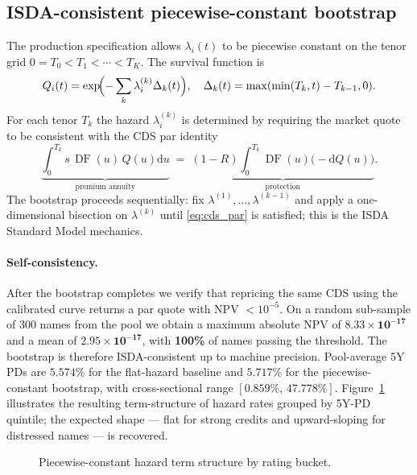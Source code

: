 \documentclass[11pt,a4paper]{article}
\newcommand{\1}{\mathbf{1}}
\newcommand{\dd}{\mathrm{d}}
\DeclareMathOperator{\DF}{DF}
\begin{document}
\subsection{ISDA-consistent piecewise-constant bootstrap}
The production specification allows \(\lambda_{i}(t)\) to be
piecewise constant on the tenor grid
\(0=T_{0}<T_{1}<\cdots<T_{K}\). The survival function is
\begin{equation}
Q_{i}(t)=\exp\!\Bigl(-\sum_{k}\lambda_{i}^{(k)}\Delta_{k}(t)\Bigr),
\quad \Delta_{k}(t)=\max(\min(T_{k},t)-T_{k-1},0).
\label{eq:survival_pwc}
\end{equation}
For each tenor \(T_{k}\) the hazard \(\lambda_{i}^{(k)}\) is determined
by requiring the market quote to be consistent with the CDS par identity
\begin{equation}
\underbrace{\int_{0}^{T_{k}}s\,\DF(u)\,Q(u)\dd u}_{\text{premium annuity}}
\;=\;
\underbrace{(1-R)\int_{0}^{T_{k}}\DF(u)\bigl(-\dd Q(u)\bigr)}_{\text{protection}} .
\label{eq:cds_par}
\end{equation}
The bootstrap proceeds sequentially: fix
\(\lambda^{(1)},\dots,\lambda^{(k-1)}\) and apply a one-dimensional
bisection on \(\lambda^{(k)}\) until \eqref{eq:cds_par} is satisfied;
this is the ISDA Standard Model mechanics.

\paragraph{Self-consistency.}
After the bootstrap completes we verify that repricing the same CDS
using the calibrated curve returns a par quote with NPV
\(<10^{-5}\).  On a random sub-sample of 300 names from the pool we
obtain a maximum absolute NPV of \(\mathbf{8.33\!\times\!10^{-17}}\)
and a mean of \(\mathbf{2.95\!\times\!10^{-17}}\), with \textbf{100\%}
of names passing the threshold. The bootstrap is therefore
ISDA-consistent up to machine precision. Pool-average 5Y PDs are
\(5.574\%\) for the flat-hazard baseline and \(5.717\%\) for the
piecewise-constant bootstrap, with cross-sectional range
\([0.859\%,\,47.778\%]\).
Figure~\ref{fig:hazard_ts} illustrates the resulting term-structure of
hazard rates grouped by 5Y-PD quintile; the expected shape --- flat for
strong credits and upward-sloping for distressed names --- is recovered.

\begin{figure}[H]
    \centering
    \caption{Piecewise-constant hazard term structure by rating bucket.}
    \label{fig:hazard_ts}
\end{figure}
\end{document}
